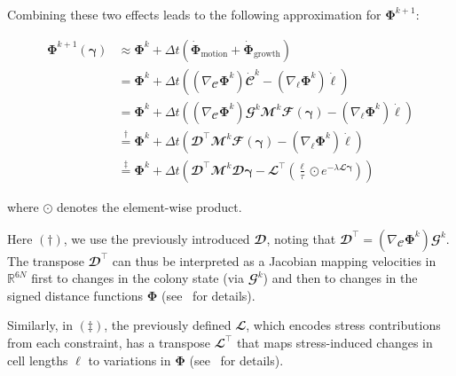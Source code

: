 \documentclass[conference]{IEEEtran}
\begin{document}
\noindent Combining these two effects leads to the following approximation for $\mathbf{\Phi}^{k+1}$:

{\small
\begin{equation}\label{eq:phi_expanded}
    \begin{split}
        \mathbf{\Phi}^{k+1}(\boldsymbol{\gamma}) & \approx \mathbf{\Phi}^k + \Delta t \left( \dot{\mathbf{\Phi}}_{\text{motion}} + \dot{\mathbf{\Phi}}_{\text{growth}} \right)\\
        & = \mathbf{\Phi}^k + \Delta t \left( (\nabla_{\mathbfcal{C}} \mathbf{\Phi}^k) \dot{\mathbfcal{C}}^k - (\nabla_{\boldsymbol{\ell}} \mathbf{\Phi}^k) \dot{\boldsymbol{\ell}} \right)\\
        & = \mathbf{\Phi}^k + \Delta t \left( (\nabla_{\mathbfcal{C}} \mathbf{\Phi}^k) \mathbfcal{G}^k \mathbfcal{M}^k  \mathbfcal{F}(\boldsymbol{\gamma}) - (\nabla_{\boldsymbol{\ell}} \mathbf{\Phi}^k) \dot{\boldsymbol{\ell}} \right)\\
        & \overset{\dagger}{=}
        \mathbf{\Phi}^k + \Delta t \left( \mathbfcal{D}^\top \mathbfcal{M}^k  \mathbfcal{F}(\boldsymbol{\gamma})
        - (\nabla_{\boldsymbol{\ell}} \mathbf{\Phi}^k) \dot{\boldsymbol{\ell}} \right)\\
        & \overset{\ddagger}{=} \mathbf{\Phi}^k + \Delta t \left( \mathbfcal{D}^\top \mathbfcal{M}^k \mathbfcal{D} \boldsymbol{\gamma} - \mathbfcal{L}^\top \left(\frac{\boldsymbol{\ell}}{\tau} \odot e^{-\lambda \mathbfcal{L} \boldsymbol{\gamma}} \right)\right)
    \end{split}
\end{equation}
}

\noindent where $\odot$ denotes the element-wise product.

Here $(\dagger)$, we use the previously introduced $\mathbfcal{D}$, noting that $\mathbfcal{D}^\top = (\nabla_{\mathbfcal{C}} \mathbf{\Phi}^k) \mathbfcal{G}^k$. The transpose $\mathbfcal{D}^\top$ can thus be interpreted as a Jacobian mapping velocities in $\mathbb{R}^{6N}$ first to changes in the colony state (via $\mathbfcal{G}^k$) and then to changes in the signed distance functions $\mathbf{\Phi}$ (see~\cite{Weady2024SM, Tasora2008,Yan_2020} for details).

Similarly, in $(\ddagger)$, the previously defined $\mathbfcal{L}$, which encodes stress contributions from each constraint, has a transpose $\mathbfcal{L}^\top$ that maps stress-induced changes in cell lengths $\boldsymbol{\ell}$ to variations in $\mathbf{\Phi}$ (see~\cite{Weady2024SM} for details).
\end{document}
